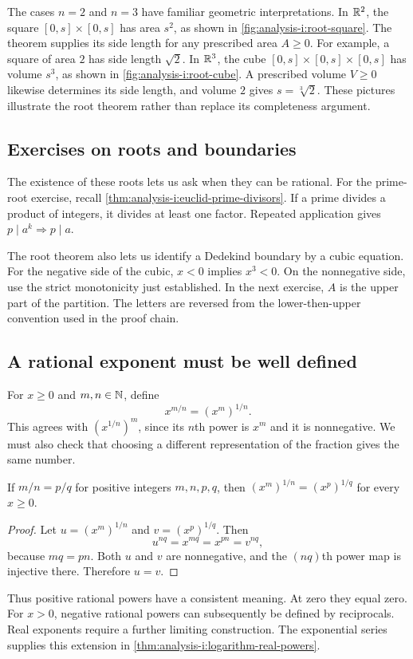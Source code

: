 The cases $n=2$ and $n=3$ have familiar geometric interpretations.
In $\mathbb{R}^2$, the square $[0,s]\times[0,s]$ has area $s^2$, as shown in
\autoref{fig:analysis-i:root-square}. The theorem supplies its side
length for any prescribed area $A\geq0$. For example, a square of area
$2$ has side length $\sqrt2$.
In $\mathbb{R}^3$, the cube $[0,s]\times[0,s]\times[0,s]$ has volume $s^3$,
as shown in \autoref{fig:analysis-i:root-cube}. A prescribed volume
$V\geq0$ likewise determines its side length, and volume $2$ gives
$s=\sqrt[3]{2}$. These pictures illustrate the root theorem rather than
replace its completeness argument.

\subsection{Exercises on roots and boundaries}
The existence of these roots lets us ask when they can be rational.
For the prime-root exercise, recall
\autoref{thm:analysis-i:euclid-prime-divisors}. If a prime divides
a product of integers, it divides at least one factor. Repeated application
gives $p\mid a^k\Longrightarrow p\mid a$.





The root theorem also lets us identify a Dedekind boundary by a cubic
equation. For the negative side of the cubic, $x<0$ implies $x^3<0$.
On the nonnegative side, use the strict monotonicity just established.
In the next exercise, $A$ is the upper part of the partition. The letters
are reversed from the lower-then-upper convention used in the proof chain.



\subsection{A rational exponent must be well defined}
For $x\geq0$ and $m,n\in\mathbb{N}$, define
\[
  x^{m/n}=(x^m)^{1/n}.
\]
This agrees with $(x^{1/n})^m$, since its $n$th power is $x^m$ and it is
nonnegative. We must also check that choosing a different representation
of the fraction gives the same number.

\begin{proposition}
  If $m/n=p/q$ for positive integers $m,n,p,q$, then
  $(x^m)^{1/n}=(x^p)^{1/q}$ for every $x\geq0$.
\end{proposition}
\begin{proof}
  Let $u=(x^m)^{1/n}$ and $v=(x^p)^{1/q}$. Then
  \[
    u^{nq}=x^{mq}=x^{pn}=v^{nq},
  \]
  because $mq=pn$. Both $u$ and $v$ are nonnegative, and the $(nq)$th
  power map is injective there. Therefore $u=v$.
\end{proof}
Thus positive rational powers have a consistent meaning. At zero they
equal zero. For $x>0$, negative rational powers can subsequently be defined
by reciprocals. Real exponents require a further limiting construction.
The exponential series supplies this extension in
\autoref{thm:analysis-i:logarithm-real-powers}.

